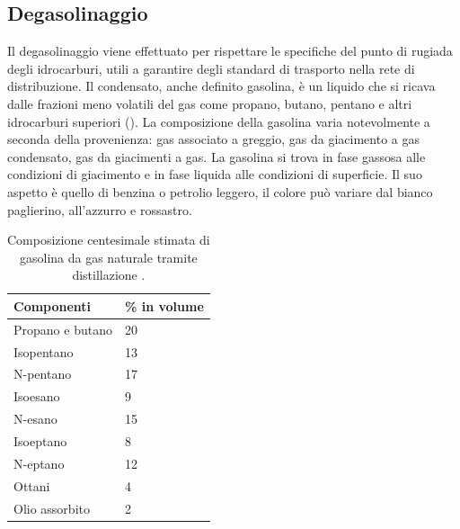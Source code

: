 \subsection{Degasolinaggio} \label{subsection:gasolina}
Il degasolinaggio viene effettuato per rispettare le specifiche del punto di rugiada degli idrocarburi, utili a garantire degli standard di trasporto nella rete di distribuzione. Il condensato, anche definito gasolina, è un liquido che si ricava dalle frazioni meno volatili del gas come propano, butano, pentano e altri idrocarburi superiori (). La composizione della gasolina varia notevolmente a seconda della provenienza: gas associato a greggio, gas da giacimento a gas condensato, gas da giacimenti a gas. La gasolina si trova in fase gassosa alle condizioni di giacimento e in fase liquida alle condizioni di superficie. Il suo aspetto è quello di benzina o petrolio leggero, il colore può variare dal bianco paglierino, all'azzurro e rossastro.
\begin{table}[htbp]
    \small
    \centering
    \caption{Composizione centesimale stimata di gasolina da gas naturale tramite distillazione \parencite{anderson1924composition}.}
    \label{tab:gasoline-composition}
    \begin{tabular}{p{}p{}}
        \hline
        {\bf Componenti}                & {\textbf{\% in volume}}       \\ \hline
        Propano e butano                & {20}                          \\
        Isopentano                      & {13}                          \\
        N-pentano                       & {17}                          \\
        Isoesano                        & {9}                           \\
        N-esano                         & {15}                          \\
        Isoeptano                       & {8}                           \\
        N-eptano                        & {12}                          \\
        Ottani                          & {4}                           \\
        Olio assorbito                  & {2}                           \\ \hline
    \end{tabular}
\end{table}
